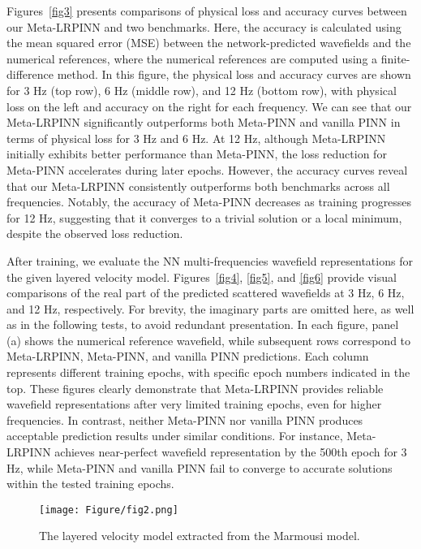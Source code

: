 Figures~\ref{fig3} presents comparisons of physical loss and accuracy curves between our Meta-LRPINN and two benchmarks. Here, the accuracy is calculated using the mean squared error (MSE) between the network-predicted wavefields and the numerical references, where the numerical references are computed using a finite-difference method. In this figure, the physical loss and accuracy curves are shown for 3 Hz (top row), 6 Hz (middle row), and 12 Hz (bottom row), with physical loss on the left and accuracy on the right for each frequency. We can see that our Meta-LRPINN significantly outperforms both Meta-PINN and vanilla PINN in terms of physical loss for 3 Hz and 6 Hz. At 12 Hz, although Meta-LRPINN initially exhibits better performance than Meta-PINN, the loss reduction for Meta-PINN accelerates during later epochs. However, the accuracy curves reveal that our Meta-LRPINN consistently outperforms both benchmarks across all frequencies. Notably, the accuracy of Meta-PINN decreases as training progresses for 12 Hz, suggesting that it converges to a trivial solution or a local minimum, despite the observed loss reduction. 

After training, we evaluate the NN multi-frequencies wavefield representations for the given layered velocity model.  Figures~\ref{fig4}, \ref{fig5}, and \ref{fig6} provide visual comparisons of the real part of the predicted scattered wavefields at 3 Hz, 6 Hz, and 12 Hz, respectively. For brevity, the imaginary parts are omitted here, as well as in the following tests, to avoid redundant presentation. In each figure, panel (a) shows the numerical reference wavefield, while subsequent rows correspond to Meta-LRPINN, Meta-PINN, and vanilla PINN predictions. Each column represents different training epochs, with specific epoch numbers indicated in the top. These figures clearly demonstrate that Meta-LRPINN provides reliable wavefield representations after very limited training epochs, even for higher frequencies. In contrast, neither Meta-PINN nor vanilla PINN produces acceptable prediction results under similar conditions. For instance, Meta-LRPINN achieves near-perfect wavefield representation by the 500th epoch for 3 Hz, while Meta-PINN and vanilla PINN fail to converge to accurate solutions within the tested training epochs. 


\begin{figure}[htbp]
\centering
\texttt{[image: Figure/fig2.png]}
\caption{The layered velocity model extracted from the Marmousi model.}
\label{fig2}
\end{figure}


